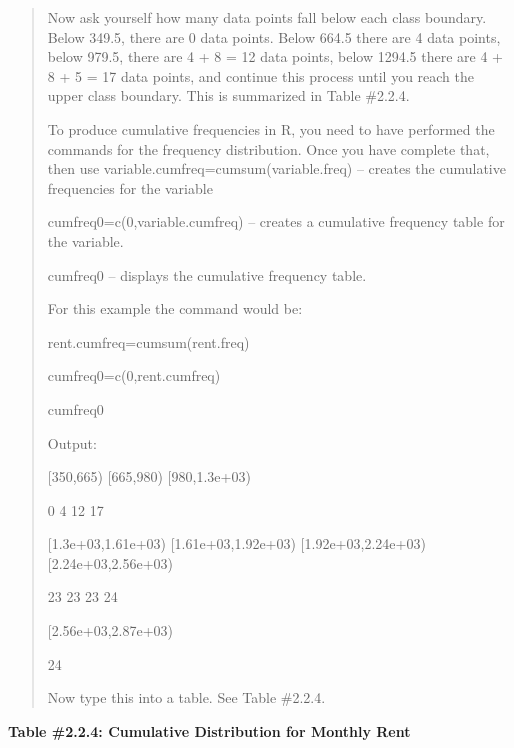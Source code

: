 \documentclass[]{book}
\begin{document}
\begin{quote}
Now ask yourself how many data points fall below each class boundary.
Below 349.5, there are 0 data points. Below 664.5 there are 4 data
points, below 979.5, there are 4 + 8 = 12 data points, below 1294.5
there are 4 + 8 + 5 = 17 data points, and continue this process until
you reach the upper class boundary. This is summarized in Table
\#2.2.4.

To produce cumulative frequencies in R, you need to have performed the
commands for the frequency distribution. Once you have complete that,
then use variable.cumfreq=cumsum(variable.freq) -- creates the
cumulative frequencies for the variable

cumfreq0=c(0,variable.cumfreq) -- creates a cumulative frequency table
for the variable.

cumfreq0 -- displays the cumulative frequency table.

For this example the command would be:

rent.cumfreq=cumsum(rent.freq)

cumfreq0=c(0,rent.cumfreq)

cumfreq0

Output:

{[}350,665) {[}665,980) {[}980,1.3e+03)

0 4 12 17

{[}1.3e+03,1.61e+03) {[}1.61e+03,1.92e+03) {[}1.92e+03,2.24e+03)
{[}2.24e+03,2.56e+03)

23 23 23 24

{[}2.56e+03,2.87e+03)

24

Now type this into a table. See Table \#2.2.4.
\end{quote}

\textbf{Table \#2.2.4: Cumulative Distribution for Monthly Rent}
\end{document}

